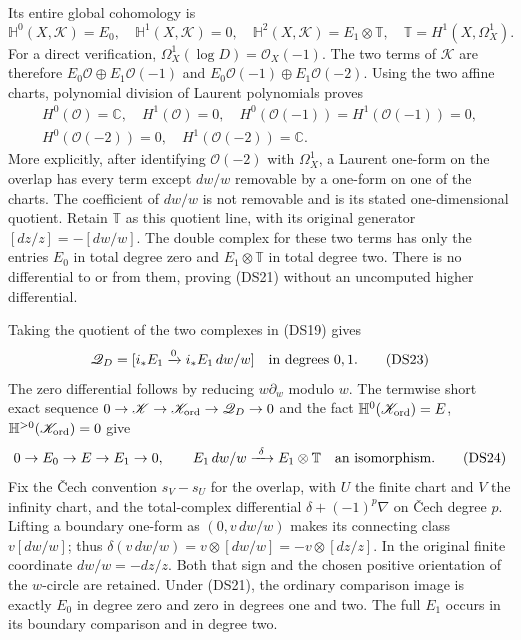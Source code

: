 Its entire global cohomology is
\[
 \mathbb H^0(X,\mathscr K)=E_0,\quad
 \mathbb H^1(X,\mathscr K)=0,\quad
 \mathbb H^2(X,\mathscr K)=E_1\otimes\mathbb T,
 \quad\mathbb T=H^1(X,\Omega_X^1).
 \tag{DS21}
\]
For a direct verification, $\Omega_X^1(\log D)=\mathcal O_X(-1)$.
The two terms of $\mathscr K$ are therefore
$E_0\mathcal O\oplus E_1\mathcal O(-1)$ and
$E_0\mathcal O(-1)\oplus E_1\mathcal O(-2)$.
Using the two affine charts, polynomial division of Laurent
polynomials proves
\[
 \begin{gathered}
 H^0(\mathcal O)=\mathbb C,\quad H^1(\mathcal O)=0,
 \quad H^0(\mathcal O(-1))=H^1(\mathcal O(-1))=0,\\
 H^0(\mathcal O(-2))=0,\quad H^1(\mathcal O(-2))=\mathbb C.
 \end{gathered}
 \tag{DS22}
\]
More explicitly, after identifying $\mathcal O(-2)$ with
$\Omega_X^1$, a Laurent one-form on the overlap has every term
except $dw/w$ removable by a one-form on one of the charts.
The coefficient of $dw/w$ is not removable and is its stated
one-dimensional quotient. Retain $\mathbb T$ as this quotient line, with
its original generator $[dz/z]=-[dw/w]$.  The double complex for these two terms
has only the entries $E_0$ in total degree zero and $E_1\otimes\mathbb T$ in total
degree two.  There is no differential to or from them, proving
(DS21) without an uncomputed higher differential.

Taking the quotient of the two complexes in (DS19) gives
\[
 \mathscr Q_D=[i_*E_1\xrightarrow{0}i_*E_1\,dw/w]
 \quad\hbox{in degrees }0,1.
 \tag{DS23}
\]
The zero differential follows by reducing $w\partial_w$ modulo $w$.
The termwise short exact sequence
$0\to\mathscr K\to\mathscr K_{\rm ord}\to\mathscr Q_D\to0$
and the fact $\mathbb H^0(\mathscr K_{\rm ord})=E$,
$\mathbb H^{>0}(\mathscr K_{\rm ord})=0$ give
\[
0\to E_0\to E\to E_1\to0,
\qquad
 E_1\,dw/w\xrightarrow{\ \delta\ }E_1\otimes\mathbb T
 \quad\hbox{an isomorphism}.
 \tag{DS24}
\]
Fix the \v Cech convention $s_V-s_U$ for the overlap, with $U$ the
finite chart and $V$ the infinity chart, and the total-complex
differential $\delta+(-1)^p\nabla$ on \v Cech degree $p$.
Lifting a boundary one-form
as $(0,v\,dw/w)$ makes its connecting class $v[dw/w]$; thus
$\delta(v\,dw/w)=v\otimes[dw/w]=-v\otimes[dz/z]$.  In the original finite coordinate
$dw/w=-dz/z$.  Both that sign and the chosen positive orientation of
the $w$-circle are retained.  Under (DS21), the ordinary comparison
image is exactly $E_0$ in degree zero and zero in degrees one and two.
The full $E_1$ occurs in its boundary comparison and in degree two.

